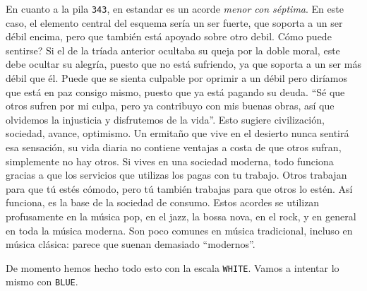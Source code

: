 \documentclass[]{report}
\begin{document}
En cuanto a la pila \texttt{343}, en estandar es un acorde \emph{menor con séptima}. En este caso, el elemento central del esquema sería un ser fuerte, que soporta a un ser débil encima, pero que también está apoyado sobre otro debil. Cómo puede sentirse? Si el de la tríada anterior ocultaba su queja por la doble moral, este debe ocultar su alegría, puesto que no está sufriendo, ya que soporta a un ser más débil que él. Puede que se sienta culpable por oprimir a un débil pero diríamos que está en paz consigo mismo, puesto que ya está pagando su deuda. ``Sé que otros sufren por mi culpa, pero ya contribuyo con mis buenas obras, así que olvidemos la injusticia y disfrutemos de la vida''. Esto sugiere civilización, sociedad, avance, optimismo. Un ermitaño que vive en el desierto nunca sentirá esa sensación, su vida diaria no contiene ventajas a costa de que otros sufran, simplemente no hay otros. Si vives en una sociedad moderna, todo funciona gracias a que los servicios que utilizas los pagas con tu trabajo. Otros trabajan para que tú estés cómodo, pero tú también trabajas para que otros lo estén. Así funciona, es la base de la sociedad de consumo. Estos acordes se utilizan profusamente en la música pop, en el jazz, la bossa nova, en el rock, y en general en toda la música moderna. Son poco comunes en música tradicional, incluso en música clásica: parece que suenan demasiado ``modernos''.

De momento hemos hecho todo esto con la escala \texttt{WHITE}. Vamos a intentar lo mismo con \texttt{BLUE}.


\end{document}
